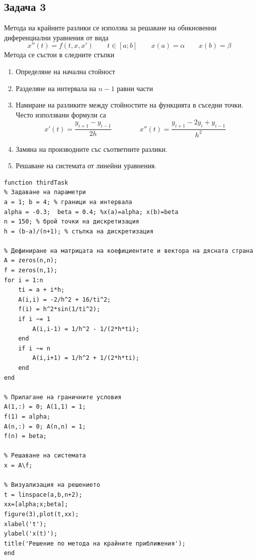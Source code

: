 \documentclass[a4paper,fleqn,12pt]{article}
\begin{document}
\newpage
\subsection{Задача 3}
Метода на крайните разлики се използва за решаване на обикновенни диференциални уравнения от вида 
\begin{equation*}
	x''(t)=f(t,x,x') \qquad t \in [a;b] \qquad x(a) = \alpha \qquad x(b) = \beta
\end{equation*}
Метода се състои в следните стъпки
\begin{enumerate}
\item Определяне на начална стойност
\item Разделяне на интервала на $n-1$ равни части
\item Намиране на разликите между стойностите на функцията в съседни точки. Често използвани формули са 
	\begin{equation*}
	x'(t) = \frac{y_{i+1} - y_{i-1}}{2h} \qquad \qquad x''(t) = \frac{y_{i+1} - 2y_i + y_{i-1}}{h^2}
	\end{equation*}
\item Замяна на производните със съответните разлики.
\item Решаване на системата от линейни уравнения.
\end{enumerate}

\newpage
\begin{verbatim}
function thirdTask
% Задаване на параметри
a = 1; b = 4; % граници на интервала
alpha = -0.3;  beta = 0.4; %x(a)=alpha; x(b)=beta
n = 150; % брой точки на дискретизация
h = (b-a)/(n+1); % стъпка на дискретизация

% Дефиниране на матрицата на коефициентите и вектора на дясната страна
A = zeros(n,n);
f = zeros(n,1);
for i = 1:n
    ti = a + i*h;
    A(i,i) = -2/h^2 + 16/ti^2;
    f(i) = h^2*sin(1/ti^2);
    if i ~= 1
        A(i,i-1) = 1/h^2 - 1/(2*h*ti);
    end
    if i ~= n
        A(i,i+1) = 1/h^2 + 1/(2*h*ti);
    end
end

% Прилагане на граничните условия
A(1,:) = 0; A(1,1) = 1;
f(1) = alpha;
A(n,:) = 0; A(n,n) = 1;
f(n) = beta;

% Решаване на системата
x = A\f;

% Визуализация на решението
t = linspace(a,b,n+2);
xx=[alpha;x;beta];
figure(3),plot(t,xx);
xlabel('t');
ylabel('x(t)');
title('Решение по метода на крайните приближения');
end
\end{verbatim}
\end{document}
